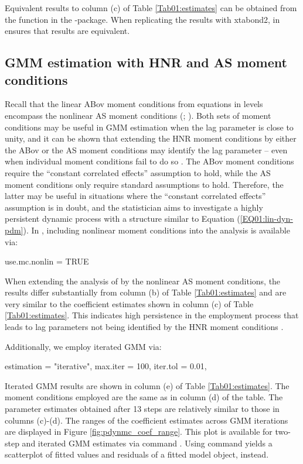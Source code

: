 Equivalent results to column (c) of Table \ref{Tab01:estimates} can be obtained from the  function in the -package. When replicating the results with xtabond2,  in  ensures that results are equivalent.








\subsection{GMM estimation with HNR and AS moment conditions}
Recall that the linear ABov moment conditions from equations in levels encompass the nonlinear AS moment conditions (\citealp[][]{BluBon1998}; \citealp[a derivation is provided in][]{Fri2019}). Both sets of moment conditions may be useful in GMM estimation when the lag parameter is close to unity, and it can be shown that extending the HNR moment conditions by either the ABov or the AS moment conditions may identify the lag parameter -- even when individual moment conditions fail to do so \citep{BluBon1998,BunKle2014,GorHanXue2016}. The ABov moment conditions require the ``constant correlated effects'' assumption to hold, while the AS moment conditions only require standard assumptions to hold. Therefore, the latter may be useful in situations where the ``constant correlated effects'' assumption is in doubt, and the statistician aims to investigate a highly persistent dynamic process with a structure similar to Equation (\ref{EQ01:lin-dyn-pdm}).
In , including nonlinear moment conditions into the analysis is available via:
\begin{example}
use.mc.nonlin = TRUE
\end{example}
When extending the analysis of \citet{AreBon1991} by the nonlinear AS moment conditions, the results differ substantially from column (b) of Table \ref{Tab01:estimates} and are very similar to the coefficient estimates shown in column (c) of Table \ref{Tab01:estimates}. This indicates high persistence in the employment process that leads to lag parameters not being identified by the HNR moment conditions \citep{BunKle2014,GorHanXue2016}.

Additionally, we employ iterated GMM via:
\begin{example}
estimation = "iterative", max.iter = 100, iter.tol = 0.01,
\end{example}
Iterated GMM results are shown in column (e) of Table \ref{Tab01:estimates}. The moment conditions employed are the same as in column (d) of the table. The parameter estimates obtained after 13 steps are relatively similar to those in columns (c)-(d). The ranges of the coefficient estimates across GMM iterations are displayed in Figure \ref{fig:pdynmc_coef_range}. This plot is available for two-step and iterated GMM estimates via command . Using command  yields a scatterplot of fitted values and residuals of a fitted model object, instead.


